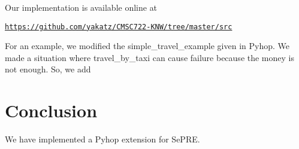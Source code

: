 \documentclass[11pt]{article} %
\begin{document}
Our implementation is available online at
\begin{center}
\href{https://github.com/yakatz/CMSC722-KNW/tree/master/src}
{\tt https://github.com/yakatz/CMSC722-KNW/tree/master/src}
\end{center}

For an example, we modified the simple_travel_example given in Pyhop.
We made a situation where travel_by_taxi can cause failure because
the money is not enough. So, we add


\section{Conclusion}

We have implemented a Pyhop extension for SePRE.



\end{document}
